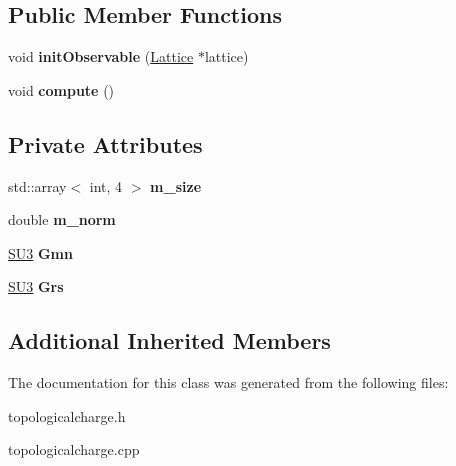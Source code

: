 \subsection*{Public Member Functions}
\begin{DoxyCompactItemize}
\item 
void {\bfseries init\+Observable} (\hyperlink{classLattice}{Lattice} $\ast$lattice)\hypertarget{classTopologicalCharge_a3738265d7e456997ba0ff57bcba55188}{}\label{classTopologicalCharge_a3738265d7e456997ba0ff57bcba55188}

\item 
void {\bfseries compute} ()\hypertarget{classTopologicalCharge_a67b19b74c8c4f981d37490623ca774f2}{}\label{classTopologicalCharge_a67b19b74c8c4f981d37490623ca774f2}

\end{DoxyCompactItemize}
\subsection*{Private Attributes}
\begin{DoxyCompactItemize}
\item 
std\+::array$<$ int, 4 $>$ {\bfseries m\+\_\+size}\hypertarget{classTopologicalCharge_a7c710f7c182d1255533438fb343cf8ee}{}\label{classTopologicalCharge_a7c710f7c182d1255533438fb343cf8ee}

\item 
double {\bfseries m\+\_\+norm}\hypertarget{classTopologicalCharge_a35210a65883371d53d0eecbf90ef3ffd}{}\label{classTopologicalCharge_a35210a65883371d53d0eecbf90ef3ffd}

\item 
\hyperlink{structSU3}{S\+U3} {\bfseries Gmn}\hypertarget{classTopologicalCharge_a428ef097640a91fe39c3b2936cd64ad0}{}\label{classTopologicalCharge_a428ef097640a91fe39c3b2936cd64ad0}

\item 
\hyperlink{structSU3}{S\+U3} {\bfseries Grs}\hypertarget{classTopologicalCharge_a65cd1f2ba971ec5e92b60188b94b1a33}{}\label{classTopologicalCharge_a65cd1f2ba971ec5e92b60188b94b1a33}

\end{DoxyCompactItemize}
\subsection*{Additional Inherited Members}


The documentation for this class was generated from the following files\+:\begin{DoxyCompactItemize}
\item 
topologicalcharge.\+h\item 
topologicalcharge.\+cpp\end{DoxyCompactItemize}
